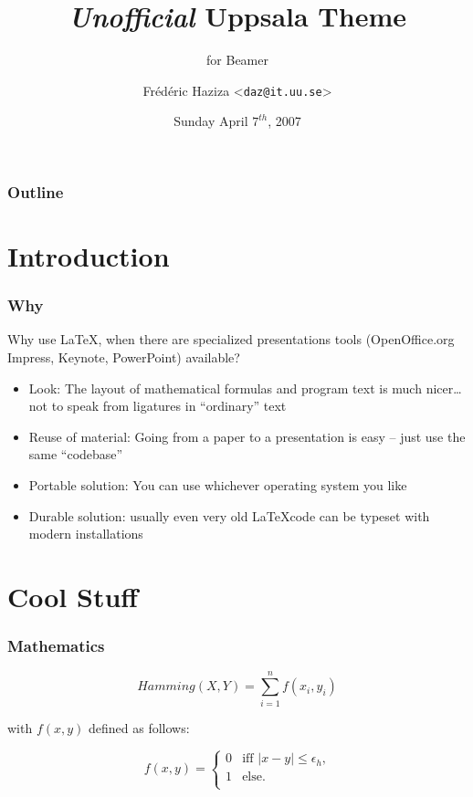 \documentclass{beamer}
\title{\emph{Unofficial} Uppsala Theme}
\subtitle{for Beamer}
\author[Fr\'ed\'eric Haziza | \emph{daz@it.uu.se}] %
{Fr\'ed\'eric Haziza <\texttt{daz@it.uu.se}>}
\institute[Dept. of Information Technology] %
{
  Department of Computer Systems\\
  Uppsala University
}
\date[2007-04-07] %
{Sunday April $7^{th}$, 2007}
\begin{document}
\begin{frame}[plain] %
  \titlepage
\end{frame}

\begin{frame}
    \frametitle{Outline}
    \tableofcontents[currentsection]
\end{frame}

\section{Introduction}

\begin{frame}
  \frametitle{Why}

  Why use \LaTeX, when there are specialized presentations tools (OpenOffice.org Impress, Keynote, PowerPoint) available?

  \begin{itemize}
    \item{Look: The layout of mathematical formulas and program text is much nicer\ldots not to speak from ligatures in ``ordinary'' text}
    \item{Reuse of material: Going from a paper to a presentation is easy -- just use the same ``codebase''}
    \item{Portable solution: You can use whichever operating system you like}
    \item{Durable solution: usually even very old \LaTeX code can be typeset with modern installations}
  \end{itemize}

\end{frame}

\section{Cool Stuff}

\begin{frame}
  \frametitle{Mathematics}

  \begin{example}
    \begin{equation}
      \mathit{Hamming} (X,Y) = \sum_{i=1}^{n} f (x_{i}, y_{i})
    \end{equation}
  \end{example}

with $f(x,y)$ defined as follows:

  \begin{definition}
    \begin{equation}
      f(x,y)= \left\{ \begin{array}{ll}
          0 & \mbox{iff $|x-y| \leq \epsilon_{h}$,} \\
          1 & \mbox{else.}      \\
        \end{array}
      \right.
    \end{equation}
  \end{definition}

\end{frame}
\end{document}
